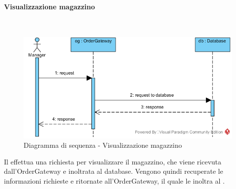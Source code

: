 \begin{samepage}
\paragraph{Visualizzazione magazzino}\mbox{}\\
\end{samepage}
\begin{figure}[H]
	\centering
	\includegraphics[width=14cm]{../../documenti/SpecificaTecnica/diagrammi_img/sequenza/direttore_visualizza_magazzino.png}
	\caption{Diagramma di sequenza - Visualizzazione magazzino}
\end{figure}
Il \Manager{} effettua una richiesta per visualizzare il magazzino, che viene ricevuta dall'Order\-Gateway e inoltrata al database. Vengono quindi recuperate le informazioni richieste e ritornate all'Order\-Gateway, il quale le inoltra al \Manager{}.

